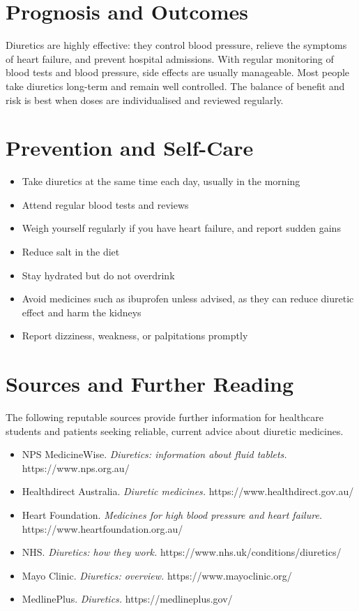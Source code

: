 \section*{Prognosis and Outcomes}
Diuretics are highly effective: they control blood pressure, relieve the symptoms of heart failure, and prevent hospital admissions. With regular monitoring of blood tests and blood pressure, side effects are usually manageable. Most people take diuretics long-term and remain well controlled. The balance of benefit and risk is best when doses are individualised and reviewed regularly.

\section*{Prevention and Self-Care}
\begin{itemize}
    \item Take diuretics at the same time each day, usually in the morning
    \item Attend regular blood tests and reviews
    \item Weigh yourself regularly if you have heart failure, and report sudden gains
    \item Reduce salt in the diet
    \item Stay hydrated but do not overdrink
    \item Avoid medicines such as ibuprofen unless advised, as they can reduce diuretic effect and harm the kidneys
    \item Report dizziness, weakness, or palpitations promptly
\end{itemize}

\section*{Sources and Further Reading}
The following reputable sources provide further information for healthcare students and patients seeking reliable, current advice about diuretic medicines.

\begin{itemize}
    \item NPS MedicineWise. \textit{Diuretics: information about fluid tablets.} https://www.nps.org.au/
    \item Healthdirect Australia. \textit{Diuretic medicines.} https://www.healthdirect.gov.au/
    \item Heart Foundation. \textit{Medicines for high blood pressure and heart failure.} https://www.heartfoundation.org.au/
    \item NHS. \textit{Diuretics: how they work.} https://www.nhs.uk/conditions/diuretics/
    \item Mayo Clinic. \textit{Diuretics: overview.} https://www.mayoclinic.org/
    \item MedlinePlus. \textit{Diuretics.} https://medlineplus.gov/
\end{itemize}
